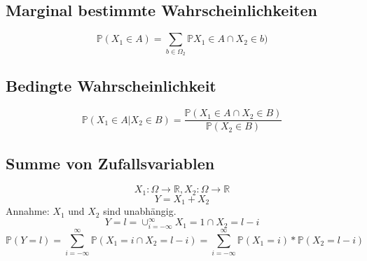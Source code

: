 \vspace{10pt}

\subsection *{Marginal bestimmte Wahrscheinlichkeiten}

\vspace{5pt}

\begin{equation*}
\mathds{P} ({X_{1} \in A } ) = \sum_{b \in \Omega_{2} } \mathds{P} {X_{1} \in A} \cap {X_{2} \in b})
\end{equation*}

\vspace{10pt}

\subsection *{Bedingte Wahrscheinlichkeit}

\vspace{5pt}

\begin{equation*}
\mathds{P} ({X_{1} \in A } | { X_{2} \in B } ) = \frac {\mathds{P} ( {X_{1} \in A } \cap {X_{2} \in B })} {\mathds{P} ({X_{2} \in B})}
\end{equation*}

\vspace{10pt}

\subsection *{Summe von Zufallsvariablen}

\vspace{5pt}
\begin{equation*}
X_{1}:\Omega \longrightarrow \mathds{R}, X_{2}:\Omega \longrightarrow \mathds{R}
\end{equation*}
\begin{equation*}
Y=X_{1}+X_{2}
\end{equation*}
\vspace{3pt}
Annahme: $X_{1}$ und $X_{2}$ sind unabh\"angig.\\
\begin{equation*}
{Y=l}=\cup_{i=-\infty}^{\infty} {X_{1}=1} \cap {X_{2}=l-i}
\end{equation*}
\vspace{3pt}
\begin{equation*}
\mathds{P} ({Y=l}) = \sum_{i=-\infty}^{\infty} \mathds{P} ({X_{1}=i} \cap {X_{2}=l-i}) = \sum_{i=-\infty}^{\infty} \mathds{P} ({X_{1} = i}) * \mathds{P} ({X_{2}=l-i})
\end{equation*}

